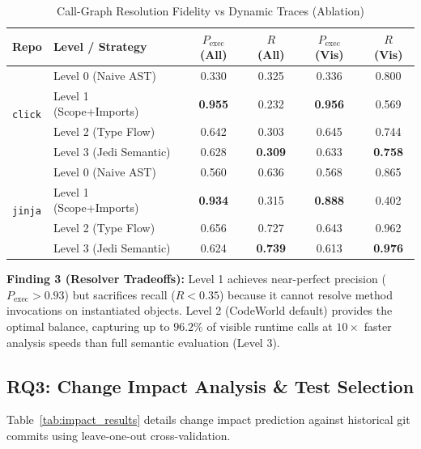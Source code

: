 \documentclass[conference]{IEEEtran}
\begin{document}
\begin{table}[htbp]
\caption{Call-Graph Resolution Fidelity vs Dynamic Traces (Ablation)}
\label{tab:callgraph_ablation}
\centering
\small
\begin{tabular}{llcccc}
\toprule
\textbf{Repo} & \textbf{Level / Strategy} & \textbf{$P_{\text{exec}}$ (All)} & \textbf{$R$ (All)} & \textbf{$P_{\text{exec}}$ (Vis)} & \textbf{$R$ (Vis)} \\
\midrule
\multirow{4}{*}{\texttt{click}}
& Level 0 (Naive AST)     & 0.330 & 0.325 & 0.336 & 0.800 \\
& Level 1 (Scope+Imports) & \textbf{0.955} & 0.232 & \textbf{0.956} & 0.569 \\
& Level 2 (Type Flow)     & 0.642 & 0.303 & 0.645 & 0.744 \\
& Level 3 (Jedi Semantic) & 0.628 & \textbf{0.309} & 0.633 & \textbf{0.758} \\
\midrule
\multirow{4}{*}{\texttt{jinja}}
& Level 0 (Naive AST)     & 0.560 & 0.636 & 0.568 & 0.865 \\
& Level 1 (Scope+Imports) & \textbf{0.934} & 0.315 & \textbf{0.888} & 0.402 \\
& Level 2 (Type Flow)     & 0.656 & 0.727 & 0.643 & 0.962 \\
& Level 3 (Jedi Semantic) & 0.624 & \textbf{0.739} & 0.613 & \textbf{0.976} \\
\bottomrule
\end{tabular}
\end{table}

\textbf{Finding 3 (Resolver Tradeoffs):} Level 1 achieves near-perfect precision ($P_{\text{exec}} > 0.93$) but sacrifices recall ($R < 0.35$) because it cannot resolve method invocations on instantiated objects. Level 2 (CodeWorld default) provides the optimal balance, capturing up to $96.2\%$ of visible runtime calls at $10\times$ faster analysis speeds than full semantic evaluation (Level 3).

\subsection{RQ3: Change Impact Analysis \& Test Selection}
Table~\ref{tab:impact_results} details change impact prediction against historical git commits using leave-one-out cross-validation.
\end{document}
